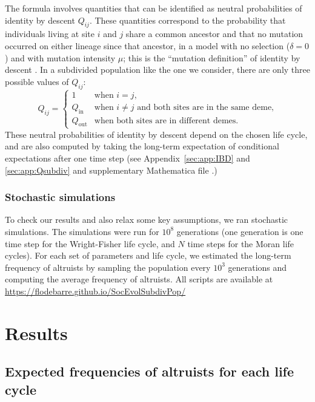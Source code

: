 \documentclass[11pt, letterpaper]{article}
\newcommand{\appname}[0]{Appendix}
\newcommand{\inn}{\textrm{in}}
\newcommand{\out}{\textrm{out}}
\newcommand{\Qin}{Q_{\inn}}
\newcommand{\Qout}{Q_{\out}}
\newcommand{\selstr}{\delta}
\begin{document}
The formula involves quantities that can be identified as neutral probabilities of identity by descent $Q_{ij}$. These quantities correspond to the probability that individuals living at site $i$  and $j$ share a common ancestor and that no mutation occurred on either lineage since that ancestor, in a model with no selection ($\selstr=0$) and with mutation intensity $\mu$; this is the ``mutation definition'' of identity by descent \citep{RoussetBilliard2000}. 
In a subdivided population like the one we consider, there are only three possible values of $Q_{ij}$:
%
\begin{equation}\label{eq:Q3}
Q_{ij} = \begin{cases} 1 & \textrm{when $i=j$,} \\
\Qin & \textrm{when $i\neq j$ and both sites are in the same deme,}\\
\Qout & \textrm{when both sites are in different demes.}
\end{cases}
\end{equation}
%
These neutral probabilities of identity by descent depend on the chosen life cycle, and are also computed by taking the long-term expectation of conditional expectations after one time step (see \appname~\ref{sec:app:IBD} and \ref{sec:app:Qsubdiv} and supplementary Mathematica file \citep{Mathematica11}.) 

\subsubsection*{Stochastic simulations}
To check our results and also relax some key assumptions, we ran stochastic simulations. The simulations were run for $10^8$ generations (one generation is one time step for the Wright-Fisher life cycle, and $N$ time steps for the Moran life cycles). For each set of parameters and life cycle, we estimated the long-term frequency of altruists by sampling the population every $10^3$ generations and computing the average frequency of altruists. 
%
All scripts are available at \\
{\small \url{https://flodebarre.github.io/SocEvolSubdivPop/}}

\section*{Results}


\subsection*{Expected frequencies of altruists for each life cycle}
\end{document}
